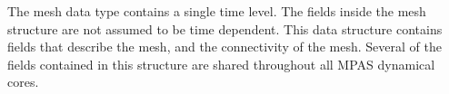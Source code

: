 The mesh data type contains a single time level. The fields inside the mesh
structure are not assumed to be time dependent. This data structure contains
fields that describe the mesh, and the connectivity of the mesh. Several of the
fields contained in this structure are shared throughout all MPAS dynamical
cores.
